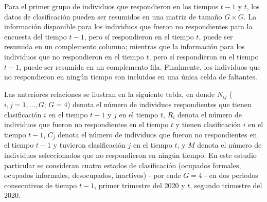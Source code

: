 \documentclass[
  12pt,
]{book}
\begin{document}
Para el primer grupo de individuos que respondieron en los tiempos \(t-1\) y \(t\), los datos de clasificación pueden ser resumidos en una matriz de tamaño \(G\times G\). La información disponible para los individuos que fueron no respondientes para la encuesta del tiempo \(t-1\), pero sí respondieron en el tiempo \(t\), puede ser resumida en un complemento columna; mientras que la información para los individuos que no respondieron en el tiempo \(t\), pero sí respondieron en el tiempo \(t-1\), puede ser resumida en un complemento fila. Finalmente, los individuos que no respondieron en ningún tiempo son incluidos en una única celda de faltantes.

Las anteriores relaciones se ilustran en la siguiente tabla, en donde \(N_{ij}\) (\(i,j=1,\ldots,G\); \(G=4\)) denota el número de individuos respondientes que tienen clasificación \(i\) en el tiempo \(t-1\) y \(j\) en el tiempo \(t\), \(R_i\) denota el número de individuos que fueron no respondientes en el tiempo \(t\) y tienen clasificación \(i\) en el tiempo \(t-1\), \(C_j\) denota el número de individuos que fueron no respondientes en el tiempo \(t-1\) y tuvieron clasificación \(j\) en el tiempo \(t\), y \(M\) denota el número de individuos seleccionados que no respondieron en ningún tiempo. En este estudio particular se consideran cuatro estados de clasificación (ocupados formales, ocupados informales, desocupados, inactivos) - por ende \(G = 4\) - en dos periodos consecutivos de tiempo \(t-1\), primer trimestre del 2020 y \(t\), segundo trimestre del 2020.
\end{document}
